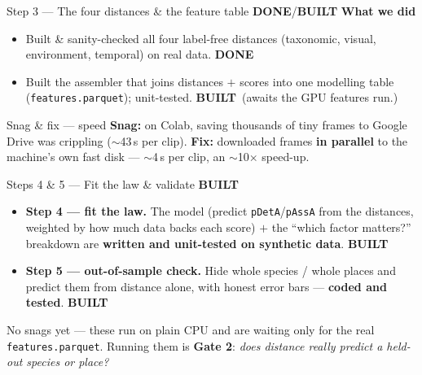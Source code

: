 \documentclass[aspectratio=169,11pt]{beamer}
\newcommand{\badge}[2]{\colorbox{#1!20}{\small\color{#1}\textbf{#2}}}
\newcommand{\dn}{\badge{forest}{DONE}}
\newcommand{\bt}{\badge{navy}{BUILT}}
\newcommand{\snag}[2]{\textbf{\color{burnt}Snag:} #1\; \textbf{\color{forest}Fix:} #2}
\begin{document}
\begin{frame}{Step 3 --- The four distances \& the feature table \hfill \dn\;/\;\bt}
  \textbf{What we did}
  \begin{itemize}
    \item Built \& sanity-checked all four label-free distances (taxonomic, visual, environment,
          temporal) on real data. \dn
    \item Built the assembler that joins distances $+$ scores into one modelling table
          (\texttt{features.parquet}); unit-tested. \bt\ (awaits the GPU features run.)
  \end{itemize}
  \vspace{0.3em}
  \begin{block}{Snag \& fix --- speed}\footnotesize
    \snag{on Colab, saving thousands of tiny frames to Google Drive was crippling ($\sim$43\,s per clip).}
    {downloaded frames \textbf{in parallel} to the machine's own fast disk --- $\sim$4\,s per clip, an
     $\sim$10$\times$ speed-up.}
  \end{block}
\end{frame}

\begin{frame}{Steps 4 \& 5 --- Fit the law \& validate \hfill \bt}
  \begin{itemize}
    \item \textbf{Step 4 --- fit the law.} The model (predict \texttt{pDetA}/\texttt{pAssA} from the
          distances, weighted by how much data backs each score) $+$ the ``which factor matters?''
          breakdown are \textbf{written and unit-tested on synthetic data}. \bt
    \item \textbf{Step 5 --- out-of-sample check.} Hide whole species / whole places and predict them from
          distance alone, with honest error bars --- \textbf{coded and tested}. \bt
  \end{itemize}
  \vspace{0.3em}
  \begin{block}{}
    \centering\footnotesize No snags yet --- these run on plain CPU and are waiting only for the real
    \texttt{features.parquet}. Running them is \textbf{Gate 2}: \emph{does distance really predict a
    held-out species or place?}
  \end{block}
\end{frame}
\end{document}
